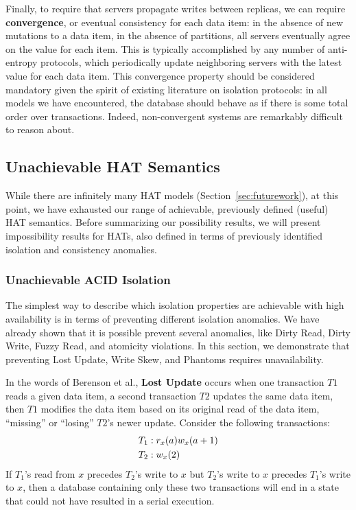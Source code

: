 Finally, to require that servers propagate writes between replicas, we
can require \textbf{convergence}, or eventual consistency for each
data item: in the absence of new mutations to a data item, in the
absence of partitions, all servers eventually agree on the value for
each item. This is typically accomplished by any number of
anti-entropy protocols, which periodically update neighboring servers
with the latest value for each data item. This convergence property
should be considered mandatory given the spirit of existing literature
on isolation protocols: in all models we have encountered, the
database should behave as if there is some total order over
transactions. Indeed, non-convergent systems are remarkably difficult
to reason about.

\subsection{Unachievable HAT Semantics}
\label{sec:unachievable-hat}

While there are infinitely many HAT models
(Section~\ref{sec:futurework}), at this point, we have exhausted our
range of achievable, previously defined (useful) HAT semantics. Before
summarizing our possibility results, we will present impossibility
results for HATs, also defined in terms of previously identified
isolation and consistency anomalies.

\subsubsection{Unachievable ACID Isolation}

The simplest way to describe which isolation properties are achievable
with high availability is in terms of preventing different isolation
anomalies. We have already shown that it is possible prevent several
anomalies, like Dirty Read, Dirty Write, Fuzzy Read, and atomicity
violations. In this section, we demonstrate that preventing Lost
Update, Write Skew, and Phantoms requires unavailability.

In the words of Berenson et al., \textbf{Lost Update} occurs when one
transaction $T1$ reads a given data item, a second transaction $T2$
updates the same data item, then $T1$ modifies the data item based on
its original read of the data item, ``missing'' or ``losing'' $T2$'s
newer update. Consider the following transactions:
\begin{align*}
\small
T_1 &: r_x(a) w_x(a+1)
\\T_2 &: w_x(2)
\end{align*}
If $T_1$'s read from $x$ precedes $T_2$'s write to $x$ but $T_2$'s
write to $x$ precedes $T_1$'s write to $x$, then a database containing
only these two transactions will end in a state that could not have
resulted in a serial execution.

